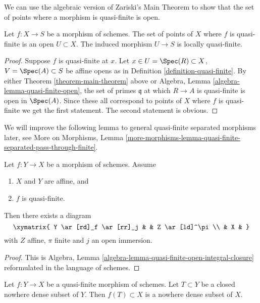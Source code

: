 \noindent
We can use the algebraic version of Zariski's Main Theorem to show that
the set of points where a morphism is quasi-finite is open.

\begin{lemma}
\label{lemma-quasi-finite-points-open}
Let $f : X \to S$ be a morphism of schemes.
The set of points of $X$ where $f$ is quasi-finite is an open
$U \subset X$. The induced morphism $U \to S$ is locally quasi-finite.
\end{lemma}

\begin{proof}
Suppose $f$ is quasi-finite at $x$.
Let $x \in U = \Spec(R) \subset X$, $V = \Spec(A) \subset S$
be affine opens as in Definition \ref{definition-quasi-finite}.
By either Theorem \ref{theorem-main-theorem} above or
Algebra, Lemma \ref{algebra-lemma-quasi-finite-open},
the set of primes $\mathfrak q$ at which $R \to A$ is quasi-finite
is open in $\Spec(A)$. Since these all correspond to points
of $X$ where $f$ is quasi-finite we get the first statement.
The second statement is obvious.
\end{proof}

\noindent
We will improve the following lemma to general quasi-finite separated
morphisms later, see
More on Morphisms, Lemma
\ref{more-morphisms-lemma-quasi-finite-separated-pass-through-finite}.

\begin{lemma}
\label{lemma-quasi-finite-affine}
Let $f : Y \to X$ be a morphism of schemes.
Assume
\begin{enumerate}
\item $X$ and $Y$ are affine, and
\item $f$ is quasi-finite.
\end{enumerate}
Then there exists a diagram
$$
\xymatrix{
Y \ar[rd]_f \ar[rr]_j & & Z \ar[ld]^\pi \\
& X &
}
$$
with $Z$ affine, $\pi$ finite and $j$ an open immersion.
\end{lemma}

\begin{proof}
This is
Algebra, Lemma \ref{algebra-lemma-quasi-finite-open-integral-closure}
reformulated in the language of schemes.
\end{proof}

\begin{lemma}
\label{lemma-image-nowhere-dense-quasi-finite}
Let $f : Y \to X$ be a quasi-finite morphism of schemes.
Let $T \subset Y$ be a closed nowhere dense subset of $Y$.
Then $f(T) \subset X$ is a nowhere dense subset of $X$.
\end{lemma}

